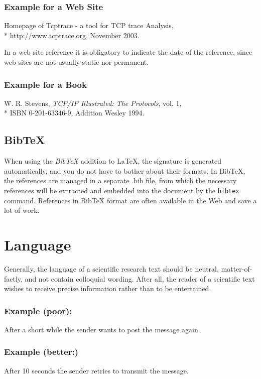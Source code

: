 \subsubsection*{Example for a Web Site}
\begin{example}
\begin{tabbing}
  [TCP03] \= Homepage of Tcptrace - a tool for TCP trace Analysis, \\*
  \> http://www.tcptrace.org, November 2003.
\end{tabbing}
\end{example}

In a web site reference it is obligatory to indicate the date of the reference, since web sites are not usually static nor permanent.


\subsubsection*{Example for a Book}
\begin{example}
\begin{tabbing}
  [Ste94] \= W. R. Stevens, \emph{TCP/IP Illustrated: The Protocols}, vol. 1,
  \\*
  \> ISBN 0-201-63346-9, Addition Wesley 1994.
\end{tabbing}
\end{example}


\subsection{BibTeX}
When using the \emph{BibTeX} addition to LaTeX, the signature is generated
automatically, and you do not have to bother about their formats. In BibTeX,
the references are managed in a separate .bib file, from which the necessary
references will be extracted and embedded into the document by the \texttt{bibtex} command. References in BibTeX format are often available in the Web and save a lot of work.

\section{Language}
Generally, the language of a scientific research text should be neutral, matter-of-factly, and not contain colloquial wording. After all, the reader of a scientific text wishes to receive precise information rather than to be entertained.

    \begin{example}
      \subsubsection*{Example (poor):}
      After a short while the sender wants to post the message again.

      \subsubsection*{Example (better:)}
      After 10 seconds the sender retries to transmit the message.
    \end{example}

